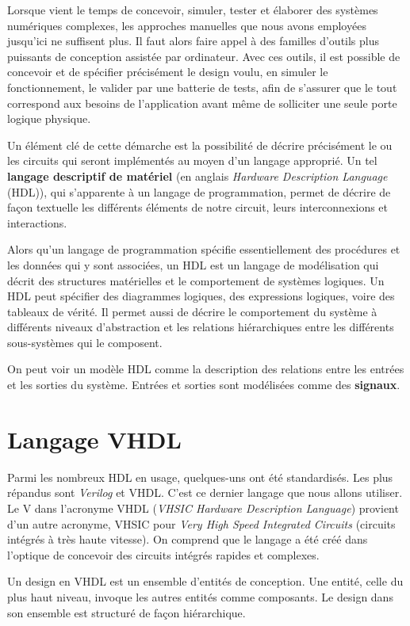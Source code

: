 \documentclass[letter, oneside]{book}
\begin{document}
Lorsque vient le temps de concevoir, simuler, tester et élaborer des
systèmes numériques complexes, les approches manuelles que nous avons
employées jusqu'ici ne suffisent plus. Il faut alors faire appel à des
familles d'outils plus puissants de conception assistée par
ordinateur. Avec ces outils, il est possible de concevoir et de
spécifier précisément le design voulu, en simuler le fonctionnement,
le valider par une batterie de tests, afin de s'assurer que le tout
correspond aux besoins de l'application avant même de solliciter une
seule porte logique physique.

Un élément clé de cette démarche est la possibilité de décrire
précisément le ou les circuits qui seront implémentés au moyen d'un
langage approprié. Un tel \textbf{langage descriptif de matériel} (en anglais
\emph{Hardware Description Language} (HDL)), qui s'apparente à un langage
de programmation, permet de décrire de façon textuelle les différents
éléments de notre circuit, leurs interconnexions et interactions.

Alors qu'un langage de programmation spécifie essentiellement des
procédures et les données qui y sont associées, un HDL est un langage
de modélisation qui décrit des structures matérielles et le
comportement de systèmes logiques. Un HDL peut spécifier des
diagrammes logiques, des expressions logiques, voire des tableaux de
vérité. Il permet aussi de décrire le comportement du système à
différents niveaux d'abstraction et les relations hiérarchiques entre
les différents sous-systèmes qui le composent.

On peut voir un modèle HDL comme la description des relations entre
les entrées et les sorties du système. Entrées et sorties sont
modélisées comme des \textbf{signaux}.

\section{Langage VHDL}
\label{sec:orgc1cab39}

Parmi les nombreux HDL en usage, quelques-uns ont été
standardisés. Les plus répandus sont \emph{Verilog} et VHDL. C'est ce
dernier langage que nous allons utiliser.  Le V dans l'acronyme VHDL
(\emph{VHSIC Hardware Description Language}) provient d'un autre acronyme,
VHSIC pour \emph{Very High Speed Integrated Circuits} (circuits intégrés à
très haute vitesse). On comprend que le langage a été créé dans
l'optique de concevoir des circuits intégrés rapides et complexes.

Un design en VHDL est un ensemble d'entités de conception. Une entité,
celle du plus haut niveau, invoque les autres entités comme
composants.  Le design dans son ensemble est structuré de façon
hiérarchique.
\end{document}
